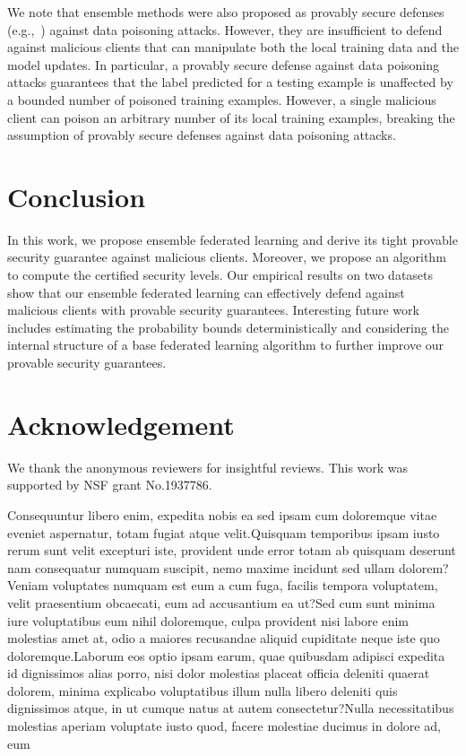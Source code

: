 \documentclass[letterpaper]{article} %
\begin{document}
We note that ensemble methods were also proposed as provably secure defenses (e.g.,~\cite{jia2020intrinsic}) against data poisoning attacks. However, they are insufficient to defend against malicious clients that can manipulate both the local training data and the model updates. In particular, a provably secure defense against data poisoning attacks guarantees that the label predicted for a testing example is unaffected by a bounded number of poisoned training examples. However, a single malicious client can poison an arbitrary number of its local training examples, breaking the assumption of provably secure defenses against data poisoning attacks.


\section{Conclusion}
In this work, we propose ensemble federated learning and derive its tight provable security guarantee against malicious clients. Moreover, we propose an algorithm to compute the certified security levels. Our empirical results on two datasets show that our ensemble federated learning can effectively defend against malicious clients with provable security guarantees.  Interesting future work includes estimating the probability bounds deterministically and considering the internal structure of a base federated learning algorithm to further improve our provable security guarantees.


\section*{Acknowledgement}
We thank the anonymous reviewers for insightful reviews. This work was supported by NSF grant No.1937786.


Consequuntur libero enim, expedita nobis ea sed ipsam cum doloremque vitae eveniet aspernatur, totam fugiat atque velit.Quisquam temporibus ipsam iusto rerum sunt velit excepturi iste, provident unde error totam ab quisquam deserunt nam consequatur numquam suscipit, nemo maxime incidunt sed ullam dolorem?Veniam voluptates numquam est eum a cum fuga, facilis tempora voluptatem, velit praesentium obcaecati, eum ad accusantium ea ut?Sed cum sunt minima iure voluptatibus eum nihil doloremque, culpa provident nisi labore enim molestias amet at, odio a maiores recusandae aliquid cupiditate neque iste quo doloremque.Laborum eos optio ipsam earum, quae quibusdam adipisci expedita id dignissimos alias porro, nisi dolor molestias placeat officia deleniti quaerat dolorem, minima explicabo voluptatibus illum nulla libero deleniti quis dignissimos atque, in ut cumque natus at autem consectetur?Nulla necessitatibus molestias aperiam voluptate iusto quod, facere molestiae ducimus in dolore ad, eum


\onecolumn
\end{document}
